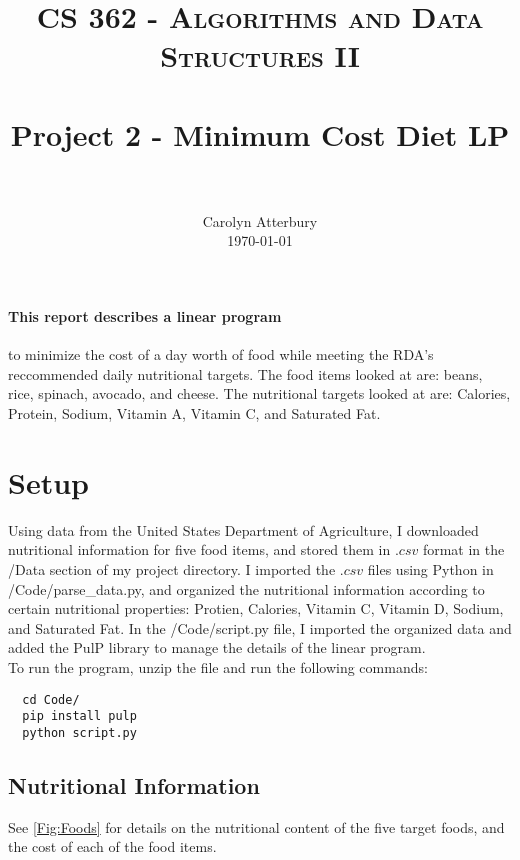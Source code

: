 \documentclass[paper=a4, fontsize=11pt]{scrartcl}
\title{
		\usefont{OT1}{bch}{b}{n}
		\normalfont \normalsize \textsc{CS 362 - Algorithms and Data Structures II} \\ [25pt]
		\horrule{0.5pt} \\[0.4cm]
		\huge Project 2 - Minimum Cost Diet LP \\
		\horrule{2pt} \\[0.5cm]
}
\author{
		\normalfont 								\normalsize
        Carolyn Atterbury\\[-3pt]		\normalsize
        \today
}
\date{}
\numberwithin{equation}{section}		%
\numberwithin{figure}{section}			%
\numberwithin{table}{section}				%
\begin{document}
\lstset{language=bash}

\maketitle

\paragraph{This report describes a linear program}to minimize the cost of a day worth of food while meeting the RDA's reccommended daily nutritional targets. The food items looked at are: beans, rice, spinach, avocado, and cheese. The nutritional targets looked at are: Calories, Protein, Sodium, Vitamin A, Vitamin C, and Saturated Fat. 

\section{Setup}
Using data from the United States Department of Agriculture, I downloaded nutritional information for five food items, and stored them in $.csv$ format in the /Data section of my project directory. I imported the $.csv$ files using Python in /Code/parse\_data.py, and organized the nutritional information according to certain nutritional properties: Protien, Calories, Vitamin C, Vitamin D, Sodium, and Saturated Fat. In the /Code/script.py file, I imported the organized data and added the PulP library to manage the details of the linear program. \\

To run the program, unzip the file and run the following commands:
\begin{lstlisting}
  cd Code/
  pip install pulp
  python script.py
\end{lstlisting}


\subsection{Nutritional Information}
See \autoref{Fig:Foods} for details on the nutritional content of the five target foods, and the cost of each of the food items.
\end{document}
